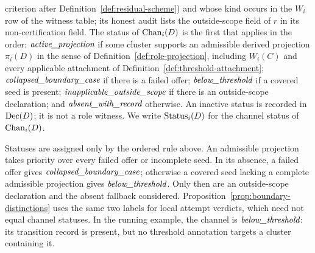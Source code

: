 \begin{definition}
criterion after Definition~\ref{def:residual-scheme}) and whose kind occurs in
the \(W_i\) row of the witness table; its honest audit lists the
outside-scope field of \(r\) in its non-certification field. The status of \(\operatorname{Chan}_{i}\!\left(D\right)\) is the
first that applies in the order: \(\textit{active\_\allowbreak projection}\) if some cluster supports
an admissible derived projection \(\pi_i(D)\) in the sense of
Definition~\ref{def:role-projection}, including \(W_i(C)\) and every
applicable attachment of Definition~\ref{def:threshold-attachment}; \(\textit{collapsed\_\allowbreak boundary\_\allowbreak case}\) if there is a
failed offer; \(\textit{below\_\allowbreak threshold}\) if a covered seed is present;
\(\textit{inapplicable\_\allowbreak outside\_\allowbreak scope}\) if there is an outside-scope declaration; and
\(\textit{absent\_\allowbreak with\_\allowbreak record}\) otherwise. An inactive status is recorded in \(\operatorname{Dec}\!\left(D\right)\); it
is not a role witness. We write \(\operatorname{Status}_{i}\!\left(D\right)\) for the channel status of
\(\operatorname{Chan}_{i}\!\left(D\right)\).
\end{definition}

Statuses are assigned only by the ordered rule above. An admissible
projection takes priority over every failed offer or incomplete seed. In its
absence, a failed offer gives \(\textit{collapsed\_\allowbreak boundary\_\allowbreak case}\); otherwise a covered seed
lacking a complete admissible projection gives \(\textit{below\_\allowbreak threshold}\). Only then are an
outside-scope declaration and the absent fallback considered.
Proposition~\ref{prop:boundary-distinctions} uses the same two labels for
local attempt verdicts, which need not equal channel statuses. In the running
example, the \Pfour{} channel is \(\textit{below\_\allowbreak threshold}\): its transition record is
present, but no threshold annotation targets a cluster containing it.

